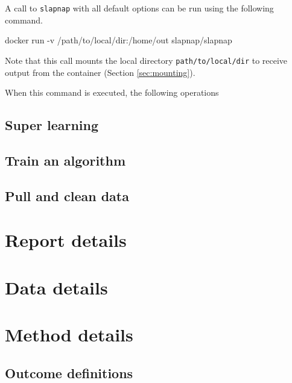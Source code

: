 \documentclass[]{article}
\newenvironment{Shaded}{\begin{snugshade}}{\end{snugshade}}
\newcommand{\ExtensionTok}[1]{#1}
\newcommand{\NormalTok}[1]{#1}
\begin{document}
A call to \texttt{slapnap} with all default options can be run using the following command.

\begin{Shaded}
\begin{Highlighting}[]
\ExtensionTok{docker}\NormalTok{ run -v /path/to/local/dir:/home/out slapnap/slapnap}
\end{Highlighting}
\end{Shaded}

Note that this call mounts the local directory \texttt{path/to/local/dir} to receive output from the container (Section \ref{sec:mounting}).

When this command is executed, the following operations

\hypertarget{super-learning}{%
\subsection{Super learning}\label{super-learning}}

\hypertarget{train-an-algorithm}{%
\subsection{Train an algorithm}\label{train-an-algorithm}}

\hypertarget{pull-and-clean-data}{%
\subsection{Pull and clean data}\label{pull-and-clean-data}}

\hypertarget{sec:report}{%
\section{Report details}\label{sec:report}}

\hypertarget{sec:data}{%
\section{Data details}\label{sec:data}}

\hypertarget{sec:methods}{%
\section{Method details}\label{sec:methods}}

\hypertarget{sec:outcomedefs}{%
\subsection{Outcome definitions}\label{sec:outcomedefs}}
\end{document}
